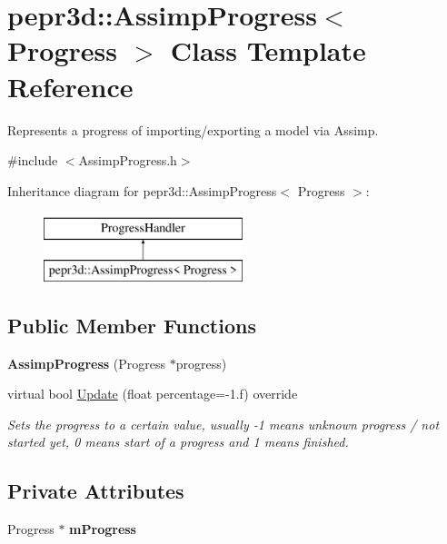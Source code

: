 \hypertarget{classpepr3d_1_1_assimp_progress}{}\section{pepr3d\+::Assimp\+Progress$<$ Progress $>$ Class Template Reference}
\label{classpepr3d_1_1_assimp_progress}


Represents a progress of importing/exporting a model via Assimp.  




{\ttfamily \#include $<$Assimp\+Progress.\+h$>$}

Inheritance diagram for pepr3d\+::Assimp\+Progress$<$ Progress $>$\+:\begin{figure}[H]
\begin{center}
\leavevmode
\includegraphics[height=2.000000cm]{classpepr3d_1_1_assimp_progress}
\end{center}
\end{figure}
\subsection*{Public Member Functions}
\begin{DoxyCompactItemize}
\item 
\mbox{\label{classpepr3d_1_1_assimp_progress_aa839af95665149e0572ad2f8ab2aa056}} 
{\bfseries Assimp\+Progress} (Progress $\ast$progress)
\item 
\mbox{\label{classpepr3d_1_1_assimp_progress_a3cce9ce3f66ff7c1bca017ec0e1caa04}} 
virtual bool \mbox{\hyperlink{classpepr3d_1_1_assimp_progress_a3cce9ce3f66ff7c1bca017ec0e1caa04}{Update}} (float percentage=-\/1.f) override
\begin{DoxyCompactList}\small\item\em Sets the progress to a certain value, usually -\/1 means unknown progress / not started yet, 0 means start of a progress and 1 means finished. \end{DoxyCompactList}\end{DoxyCompactItemize}
\subsection*{Private Attributes}
\begin{DoxyCompactItemize}
\item 
\mbox{\label{classpepr3d_1_1_assimp_progress_ac6743a64c1e024474f694e29efcd8be1}} 
Progress $\ast$ {\bfseries m\+Progress}
\end{DoxyCompactItemize}


